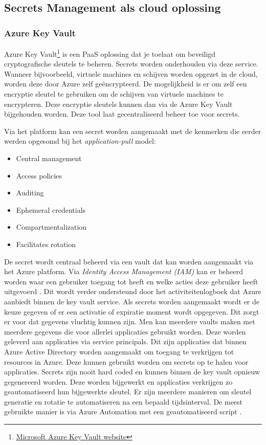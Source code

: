 \subsection{Secrets Management als cloud oplossing}
\label{sec:Key managers}
\subsubsection{Azure Key Vault}

Azure Key Vault\footnote{\href{https://azure.microsoft.com/nl-nl/services/key-vault/}{Microsoft Azure Key Vault website}} is een PaaS oplossing dat je toelaat om beveiligd cryptografische sleutels te beheren. Secrets worden onderhouden via deze service. Wanneer bijvoorbeeld, virtuele machines en schijven worden opgezet in de cloud, worden deze door Azure zelf geëncrypteerd. De mogelijkheid is er om zelf een encryptie sleutel te gebruiken om de schijven van virtuele machines te encrypteren. Deze encryptie sleutels kunnen dan via de Azure Key Vault bijgehouden worden. Deze tool laat gecentraliseerd beheer toe voor secrets.

Via het platform kan een secret worden aangemaakt met de kenmerken die eerder werden opgesomd bij het \textit{application-pull} model:

\begin{itemize}
    \item Central management
    \item Access policies
    \item Auditing
    \item Ephemeral credentials
    \item Compartmentalization
    \item Facilitates rotation
\end{itemize}

De secret wordt centraal beheerd via een vault dat kan worden aangemaakt via het Azure platform. Via \textit{Identity Access Management (IAM)} kan er beheerd worden waar een gebruiker toegang tot heeft en welke acties deze gebruiker heeft uitgevoerd \autocite{ganatra2019}. Dit wordt verder ondersteund door het activiteitenlogboek dat Azure aanbiedt binnen de key vault service. Als secrets worden aangemaakt wordt er de keuze gegeven of er een activatie of expiratie moment wordt opgegeven. Dit zorgt er voor dat gegevens vluchtig kunnen zijn. Men kan meerdere vaults maken met meerdere gegevens die voor allerlei applicaties gebruikt worden. Deze worden geleverd aan applicaties via service principals. Dit zijn applicaties dat binnen Azure Active Directory worden aangemaakt om toegang te verkrijgen tot resources in Azure. Deze kunnen gebruikt worden om secrets op te halen voor applicaties. Secrets zijn nooit hard coded en kunnen binnen de key vault opnieuw gegenereerd worden. Deze worden bijgewerkt en applicaties verkrijgen zo geautomatiseerd hun bijgewerkte sleutel. Er zijn meerdere manieren om sleutel generatie en rotatie te automatiseren na een bepaald tijdsinterval. De meest gebruikte manier is via Azure Automation met een geautomatiseerd script \autocite{Majumder2019} \autocite{Marczak2020}.

